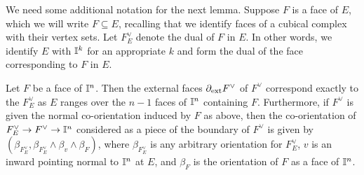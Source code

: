 We need some additional notation for the next lemma.
Suppose $F$ is a face of $E$, which we will write $F \subseteq E$, recalling that we identify faces of a cubical complex with their vertex sets.
Let $F_E^\vee$ denote the dual of $F$ in $E$.
In other words, we identify $E$ with $\mathbb{I}^k$ for an appropriate $k$ and form the dual of the face corresponding to $F$ in $E$.

\begin{lemma}\label{L: ext faces}
	Let $F$ be a face of $\mathbb{I}^n$.
	Then the external faces $\partial_{\text{ext}}F^\vee$ of $F^\vee$ correspond exactly to the $F_E^\vee$ as $E$ ranges over the $n-1$ faces of $\mathbb{I}^n$ containing $F$.
	Furthermore, if $F^\vee$ is given the normal co-orientation induced by $F$ as above, then the co-orientation of $F^\vee_E \to F^\vee \to \mathbb{I}^n$ considered as a piece of the boundary of $F^\vee$ is given by $(\beta_{F_E^\vee},\beta_{F_E^\vee} \wedge \beta_v \wedge \beta_F)$, where $\beta_{F_E^\vee}$ is any arbitrary orientation for $F_E^\vee$, $v$ is an inward pointing normal to $\mathbb{I}^n$ at $E$, and $\beta_F$ is the orientation of $F$ as a face of $\mathbb{I}^n$.
\end{lemma}

